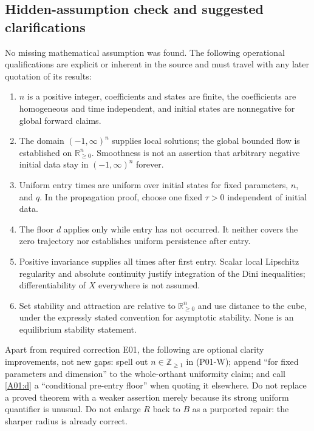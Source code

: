 \documentclass[11pt]{article}
\newcommand{\RR}{\mathbb R}
\newcommand{\ZZ}{\mathbb Z}
\newcommand{\Orth}{\RR_{\geq0}^{n}}
\newcommand{\Dom}{(-1,\infty)^n}
\begin{document}
\subsection{Hidden-assumption check and suggested clarifications}
No missing mathematical assumption was found. The following operational
qualifications are explicit or inherent in the source and must travel
with any later quotation of its results:
\begin{enumerate}
\item $n$ is a positive integer, coefficients and states are finite,
the coefficients are homogeneous and time independent, and initial
states are nonnegative for global forward claims.
\item The domain $\Dom$ supplies local solutions; the global bounded
flow is established on $\Orth$. Smoothness is not an assertion that
arbitrary negative initial data stay in $\Dom$ forever.
\item Uniform entry times are uniform over initial states for fixed
parameters, $n$, and $q$. In the propagation proof, choose one fixed
$\tau>0$ independent of initial data.
\item The floor $d$ applies only while entry has not occurred. It neither
covers the zero trajectory nor establishes uniform persistence after entry.
\item Positive invariance supplies all times after first entry. Scalar
local Lipschitz regularity and absolute continuity justify integration
of the Dini inequalities; differentiability of $X$ everywhere is not assumed.
\item Set stability and attraction are relative to $\Orth$ and use
distance to the cube, under the expressly stated convention for
asymptotic stability. None is an equilibrium stability statement.
\end{enumerate}
Apart from required correction E01, the following are optional clarity
improvements, not new gaps: spell out $n\in\ZZ_{\geq1}$ in (P01-W);
append ``for fixed parameters and dimension'' to the whole-orthant
uniformity claim; and call \eqref{A01:d} a ``conditional pre-entry
floor'' when quoting it elsewhere. Do not replace a proved theorem
with a weaker assertion merely because its strong uniform quantifier
is unusual. Do not enlarge $R$ back to $B$ as a purported repair: the
sharper radius is already correct.
\end{document}
